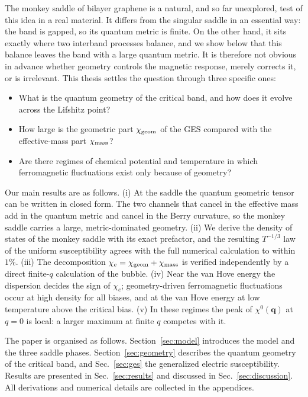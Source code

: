 \documentclass[aps,prb,twocolumn,superscriptaddress,floatfix,nofootinbib]{revtex4-2}
\newcommand{\bq}{\mathbf{q}}
\newcommand{\chie}{\chi_{e}}
\newcommand{\chig}{\chi_{\rm geom}}
\newcommand{\chim}{\chi_{\rm mass}}
\begin{document}
The monkey saddle of bilayer graphene is a natural, and so far unexplored, test of this idea in a real material. It differs from the singular saddle in an essential way: the band is gapped, so its quantum metric is finite. On the other hand, it sits exactly where two interband processes balance, and we show below that this balance leaves the band with a large quantum metric. It is therefore not obvious in advance whether geometry controls the magnetic response, merely corrects it, or is irrelevant. This thesis settles the question through three specific ones:
\begin{itemize}
    \item What is the quantum geometry of the critical band, and how does it evolve across the Lifshitz point?
    \item How large is the geometric part $\chig$ of the GES compared with the effective-mass part $\chim$?
    \item Are there regimes of chemical potential and temperature in which ferromagnetic fluctuations exist only because of geometry?
\end{itemize}

Our main results are as follows. (i) At the saddle the quantum geometric tensor can be written in closed form. The two channels that cancel in the effective mass add in the quantum metric and cancel in the Berry curvature, so the monkey saddle carries a large, metric-dominated geometry. (ii) We derive the density of states of the monkey saddle with its exact prefactor, and the resulting $T^{-1/3}$ law of the uniform susceptibility agrees with the full numerical calculation to within $1\%$. (iii) The decomposition $\chie=\chig+\chim$ is verified independently by a direct finite-$q$ calculation of the bubble. (iv) Near the van Hove energy the dispersion decides the sign of $\chie$; geometry-driven ferromagnetic fluctuations occur at high density for all biases, and at the van Hove energy at low temperature above the critical bias. (v) In these regimes the peak of $\chi^0(\bq)$ at $q=0$ is local: a larger maximum at finite $q$ competes with it.

The paper is organised as follows. Section~\ref{sec:model} introduces the model and the three saddle phases. Section~\ref{sec:geometry} describes the quantum geometry of the critical band, and Sec.~\ref{sec:ges} the generalized electric susceptibility. Results are presented in Sec.~\ref{sec:results} and discussed in Sec.~\ref{sec:discussion}. All derivations and numerical details are collected in the appendices.
\end{document}
